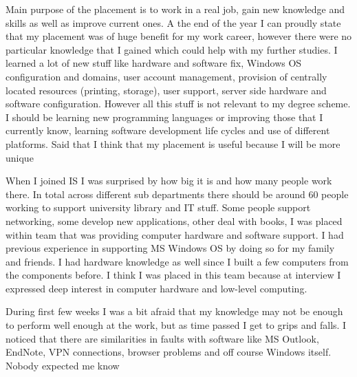 \documentclass[10pt,a4paper,headinclude=true]{report}
\begin{document}
Main purpose of the placement is to work in a real job, gain new knowledge and skills as well as improve current ones. A the end of the year I can proudly state that my placement was of huge benefit for my work career, however there were no particular knowledge that I gained which could help with my further studies. I learned a lot of new stuff like hardware and software fix, Windows OS configuration and domains, user account management, provision of centrally located resources (printing, storage), user support, server side hardware and software configuration. However all this stuff is not relevant to my degree scheme. I should be learning new programming languages or improving those that I currently know, learning software development life cycles and use of different platforms. Said that I think that my placement is useful because I will be more unique 

When I joined IS I was surprised by how big it is and how many people work there. In total across different sub departments there should be around 60 people working to support university library and IT stuff. Some people support networking, some develop new applications, other deal with books, I was placed within team that was providing computer hardware and software support. I had previous experience in supporting MS Windows OS by doing so for my family and friends. I had hardware knowledge as well since I built a few computers from the components before. I think I was placed in this team because at interview I expressed deep interest in computer hardware and low-level computing. 

During first few weeks I was a bit afraid that my knowledge may not be enough to perform well enough at the work, but as time passed I get to grips and falls. I noticed that there are similarities in faults with software like MS Outlook, EndNote, VPN connections, browser problems and off course Windows itself. Nobody expected me know 
\end{document}
